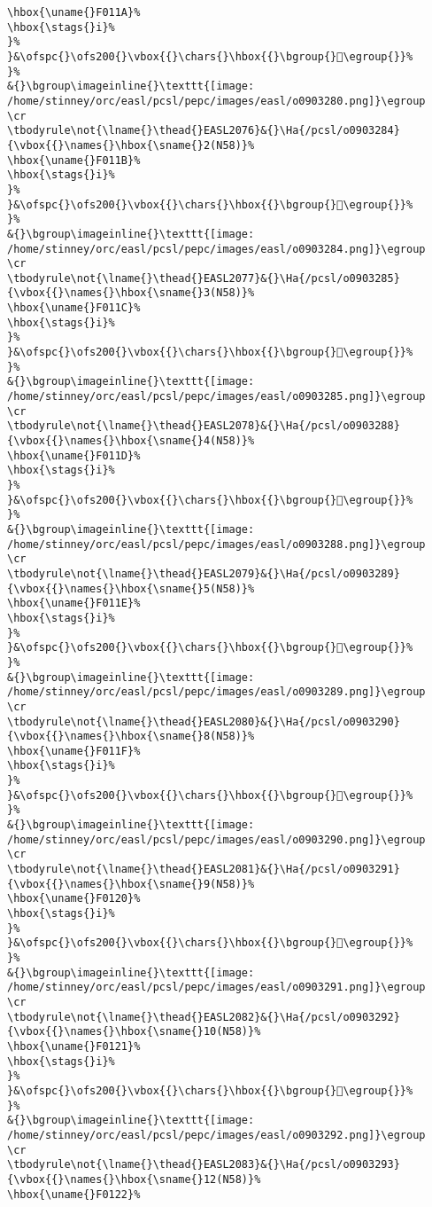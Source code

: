 \begin{verbatim}
\hbox{\uname{}F011A}%
\hbox{\stags{}i}%
}%
}&\ofspc{}\ofs200{}\vbox{{}\chars{}\hbox{{}\bgroup{}󰄚\egroup{}}%
}%
&{}\bgroup\imageinline{}\texttt{[image: /home/stinney/orc/easl/pcsl/pepc/images/easl/o0903280.png]}\egroup
\cr
\tbodyrule\not{\lname{}\thead{}EASL2076}&{}\Ha{/pcsl/o0903284}{\vbox{{}\names{}\hbox{\sname{}2(N58)}%
\hbox{\uname{}F011B}%
\hbox{\stags{}i}%
}%
}&\ofspc{}\ofs200{}\vbox{{}\chars{}\hbox{{}\bgroup{}󰄛\egroup{}}%
}%
&{}\bgroup\imageinline{}\texttt{[image: /home/stinney/orc/easl/pcsl/pepc/images/easl/o0903284.png]}\egroup
\cr
\tbodyrule\not{\lname{}\thead{}EASL2077}&{}\Ha{/pcsl/o0903285}{\vbox{{}\names{}\hbox{\sname{}3(N58)}%
\hbox{\uname{}F011C}%
\hbox{\stags{}i}%
}%
}&\ofspc{}\ofs200{}\vbox{{}\chars{}\hbox{{}\bgroup{}󰄜\egroup{}}%
}%
&{}\bgroup\imageinline{}\texttt{[image: /home/stinney/orc/easl/pcsl/pepc/images/easl/o0903285.png]}\egroup
\cr
\tbodyrule\not{\lname{}\thead{}EASL2078}&{}\Ha{/pcsl/o0903288}{\vbox{{}\names{}\hbox{\sname{}4(N58)}%
\hbox{\uname{}F011D}%
\hbox{\stags{}i}%
}%
}&\ofspc{}\ofs200{}\vbox{{}\chars{}\hbox{{}\bgroup{}󰄝\egroup{}}%
}%
&{}\bgroup\imageinline{}\texttt{[image: /home/stinney/orc/easl/pcsl/pepc/images/easl/o0903288.png]}\egroup
\cr
\tbodyrule\not{\lname{}\thead{}EASL2079}&{}\Ha{/pcsl/o0903289}{\vbox{{}\names{}\hbox{\sname{}5(N58)}%
\hbox{\uname{}F011E}%
\hbox{\stags{}i}%
}%
}&\ofspc{}\ofs200{}\vbox{{}\chars{}\hbox{{}\bgroup{}󰄞\egroup{}}%
}%
&{}\bgroup\imageinline{}\texttt{[image: /home/stinney/orc/easl/pcsl/pepc/images/easl/o0903289.png]}\egroup
\cr
\tbodyrule\not{\lname{}\thead{}EASL2080}&{}\Ha{/pcsl/o0903290}{\vbox{{}\names{}\hbox{\sname{}8(N58)}%
\hbox{\uname{}F011F}%
\hbox{\stags{}i}%
}%
}&\ofspc{}\ofs200{}\vbox{{}\chars{}\hbox{{}\bgroup{}󰄟\egroup{}}%
}%
&{}\bgroup\imageinline{}\texttt{[image: /home/stinney/orc/easl/pcsl/pepc/images/easl/o0903290.png]}\egroup
\cr
\tbodyrule\not{\lname{}\thead{}EASL2081}&{}\Ha{/pcsl/o0903291}{\vbox{{}\names{}\hbox{\sname{}9(N58)}%
\hbox{\uname{}F0120}%
\hbox{\stags{}i}%
}%
}&\ofspc{}\ofs200{}\vbox{{}\chars{}\hbox{{}\bgroup{}󰄠\egroup{}}%
}%
&{}\bgroup\imageinline{}\texttt{[image: /home/stinney/orc/easl/pcsl/pepc/images/easl/o0903291.png]}\egroup
\cr
\tbodyrule\not{\lname{}\thead{}EASL2082}&{}\Ha{/pcsl/o0903292}{\vbox{{}\names{}\hbox{\sname{}10(N58)}%
\hbox{\uname{}F0121}%
\hbox{\stags{}i}%
}%
}&\ofspc{}\ofs200{}\vbox{{}\chars{}\hbox{{}\bgroup{}󰄡\egroup{}}%
}%
&{}\bgroup\imageinline{}\texttt{[image: /home/stinney/orc/easl/pcsl/pepc/images/easl/o0903292.png]}\egroup
\cr
\tbodyrule\not{\lname{}\thead{}EASL2083}&{}\Ha{/pcsl/o0903293}{\vbox{{}\names{}\hbox{\sname{}12(N58)}%
\hbox{\uname{}F0122}%

\end{verbatim}
